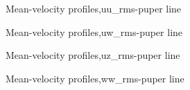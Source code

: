 \begin{figure}[H]
\centering
 \caption{Mean-velocity profiles,uu_{rms}-puper line}
\label{pd}
\end{figure}

\begin{figure}[H]
\centering
 \caption{Mean-velocity profiles,uw_{rms}-puper line}
\label{pd}
\end{figure}

\begin{figure}[H]
\centering
 \caption{Mean-velocity profiles,uz_{rms}-puper line}
\label{pd}
\end{figure}

\begin{figure}[H]
\centering
 \caption{Mean-velocity profiles,ww_{rms}-puper line}
\label{pd}
\end{figure}

\vfill




